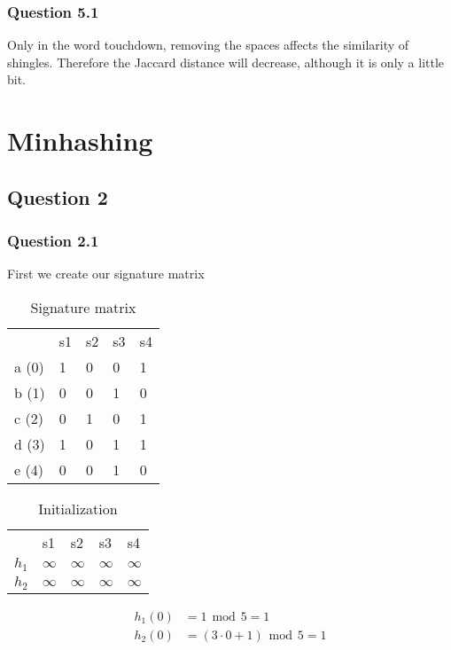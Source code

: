 \documentclass[11pt,twoside,a4paper]{article}
\begin{document}
	\subsection{Question 5.1}
		Only in the word touchdown, removing the spaces affects the similarity of shingles. Therefore the Jaccard distance will decrease, although it is only a little bit. 
		
\chapter{Minhashing}

\section{Question 2}

	\subsection{Question 2.1}
	First we create our signature matrix
	
	\begin{table}[h!]
	\centering
	\label{my-label}
	\begin{tabular}{lllll}
	 & s1 & s2 & s3 & s4 \\
	 a (0) & 1 & 0 & 0 & 1 \\
	 b (1) & 0 & 0 & 1 & 0 \\
	 c (2) & 0 & 1 & 0 & 1 \\
	 d (3) & 1 & 0 & 1 & 1 \\
	 e (4) & 0 & 0 & 1 & 0   
	\end{tabular}
	\caption{Signature matrix}
	\end{table}
	
	\begin{table}[h!]
	\centering
	\label{my-label}
	\begin{tabular}{lllll}
	 & s1 & s2 & s3 & s4 \\
	 $h_1$ & $\infty$ & $\infty$ & $\infty$ & $\infty$ \\
	 $h_2$ & $\infty$ & $\infty$ & $\infty$ & $\infty$
	\end{tabular}
	\caption{Initialization}
	\end{table}
	
	\begin{align}
		h_1(0) &= 1 \hspace{5pt} \mbox{mod} \hspace{5pt} 5 = 1 \\
		h_2(0) &= (3 \cdot 0 + 1) \hspace{5pt} \mbox{mod} \hspace{5pt} 5 = 1 
	\end{align}
	
\end{document}
